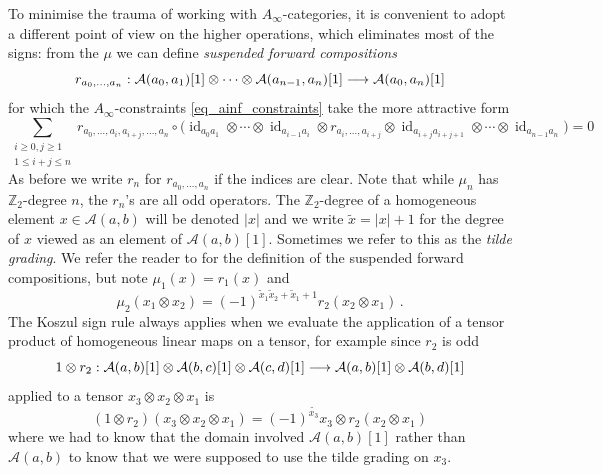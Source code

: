 \documentclass[english,letter paper,12pt,leqno]{article}
\theoremstyle{example}
\numberwithin{equation}{section}
\def\AA{\mathcal{A}}
\def\be{\begin{equation}}
\def\ee{\end{equation}}
\def\nZ{\mathds{Z}}
\begin{document}
To minimise the trauma of working with $A_\infty$-categories, it is convenient to adopt a different point of view on the higher operations, which eliminates most of the signs: from the $\mu$ we can define \emph{suspended forward compositions} \cite[\S 2.1]{lazaroiu}
\be
r_{a_0,\ldots,a_n}: \AA(a_0, a_1)[1] \otimes \cdots \otimes \AA(a_{n-1}, a_n)[1] \lto \AA(a_0,a_n)[1]
\ee
for which the $A_\infty$-constraints \eqref{eq_ainf_constraints} take the more attractive form
\[
\sum_{\substack{i \ge 0, j \ge 1 \\ 1 \le i + j \le n}} r_{a_0, \ldots, a_i, a_{i+j}, \ldots, a_n} \circ \Big( \operatorname{id}_{a_0a_1} \otimes \cdots \otimes \operatorname{id}_{a_{i-1}a_i} \otimes r_{a_i,\ldots,a_{i+j}} \otimes \operatorname{id}_{a_{i+j}a_{i+j+1}} \otimes \cdots \otimes \operatorname{id}_{a_{n-1}a_n} \Big) = 0
\]
As before we write $r_n$ for $r_{a_0,\ldots,a_n}$ if the indices are clear. Note that while $\mu_n$ has $\nZ_2$-degree $n$, the $r_n$'s are all odd operators. The $\nZ_2$-degree of a homogeneous element $x \in \AA(a,b)$ will be denoted $|x|$ and we write $\widetilde{x} = |x| + 1$ for the degree of $x$ viewed as an element of $\AA(a,b)[1]$. Sometimes we refer to this as the \emph{tilde grading}. We refer the reader to \cite{lazaroiu} for the definition of the suspended forward compositions, but note $\mu_1(x) = r_1(x)$ and
\be\label{eq:mu2vsr2}
\mu_2(x_1 \otimes x_2) = (-1)^{\widetilde{x}_1\widetilde{x}_2 + \widetilde{x}_1 + 1} r_2(x_2 \otimes x_1)\,.
\ee
The Koszul sign rule always applies when we evaluate the application of a tensor product of homogeneous linear maps on a tensor, for example since $r_2$ is odd
\[
1 \otimes r_2: \AA(a,b)[1] \otimes \AA(b,c)[1] \otimes \AA(c,d)[1] \lto \AA(a,b)[1] \otimes \AA(b,d)[1]
\]
applied to a tensor $x_3 \otimes x_2 \otimes x_1$ is
\[
(1 \otimes r_2)(x_3 \otimes x_2 \otimes x_1) = (-1)^{\widetilde{x_3}} x_3 \otimes r_2( x_2 \otimes x_1 )
\]
where we had to know that the domain involved $\AA(a,b)[1]$ rather than $\AA(a,b)$ to know that we were supposed to use the tilde grading on $x_3$. %
\end{document}
